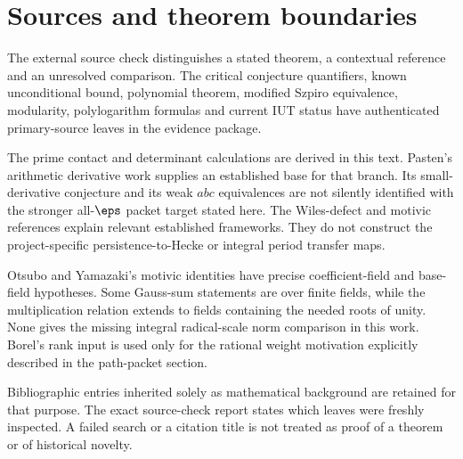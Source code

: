 \clearpage
\section{Sources and theorem boundaries}
The external source check distinguishes a stated theorem, a contextual reference and an unresolved comparison. The critical conjecture quantifiers, known unconditional bound, polynomial theorem, modified Szpiro equivalence, modularity, polylogarithm formulas and current IUT status have authenticated primary-source leaves in the evidence package.

The prime contact and determinant calculations are derived in this text. Pasten's arithmetic derivative work supplies an established base for that branch. Its small-derivative conjecture and its weak $abc$ equivalences are not silently identified with the stronger all-$\eps$ packet target stated here. The Wiles-defect and motivic references explain relevant established frameworks. They do not construct the project-specific persistence-to-Hecke or integral period transfer maps.

Otsubo and Yamazaki's motivic identities have precise coefficient-field and base-field hypotheses. Some Gauss-sum statements are over finite fields, while the multiplication relation extends to fields containing the needed roots of unity. None gives the missing integral radical-scale norm comparison in this work. Borel's rank input is used only for the rational weight motivation explicitly described in the path-packet section.

Bibliographic entries inherited solely as mathematical background are retained for that purpose. The exact source-check report states which leaves were freshly inspected. A failed search or a citation title is not treated as proof of a theorem or of historical novelty.

